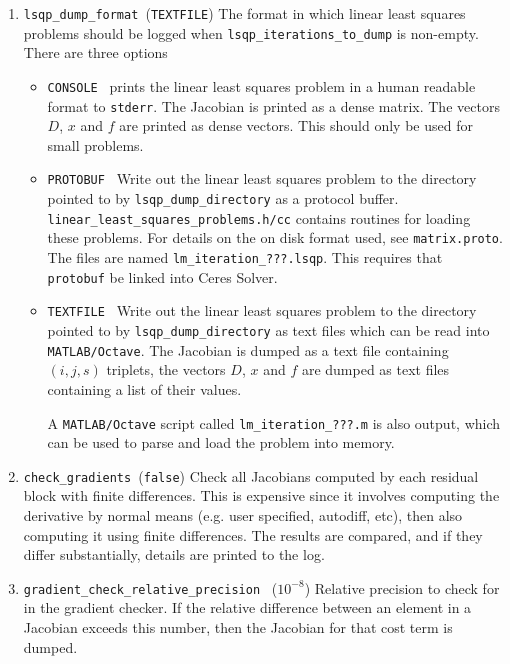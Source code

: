 \begin{enumerate}
\item{\texttt{lsqp\_dump\_format }}(\texttt{TEXTFILE}) The format in which linear least squares problems should be logged
when \texttt{lsqp\_iterations\_to\_dump} is non-empty.  There are three options
\begin{itemize}
\item{\texttt{CONSOLE }} prints the linear least squares problem in a human readable format
  to \texttt{stderr}. The Jacobian is printed as a dense matrix. The vectors
   $D$, $x$ and $f$ are printed as dense vectors. This should only be used
   for small problems.
\item{\texttt{PROTOBUF }}
   Write out the linear least squares problem to the directory
   pointed to by \texttt{lsqp\_dump\_directory} as a protocol
   buffer. \texttt{linear\_least\_squares\_problems.h/cc} contains routines for
   loading these problems. For details on the on disk format used,
   see \texttt{matrix.proto}. The files are named \texttt{lm\_iteration\_???.lsqp}. This requires that \texttt{protobuf} be linked into Ceres Solver.
\item{\texttt{TEXTFILE }}
   Write out the linear least squares problem to the directory
   pointed to by \texttt{lsqp\_dump\_directory} as text files
   which can be read into \texttt{MATLAB/Octave}. The Jacobian is dumped as a
   text file containing $(i,j,s)$ triplets, the vectors $D$, $x$ and $f$ are
   dumped as text files containing a list of their values.

   A \texttt{MATLAB/Octave} script called \texttt{lm\_iteration\_???.m} is also output,
   which can be used to parse and load the problem into memory.
\end{itemize}



\item{\texttt{check\_gradients }}(\texttt{false})
 Check all Jacobians computed by each residual block with finite
     differences. This is expensive since it involves computing the
     derivative by normal means (e.g. user specified, autodiff,
     etc), then also computing it using finite differences. The
     results are compared, and if they differ substantially, details
     are printed to the log.

\item{\texttt{gradient\_check\_relative\_precision }} ($10^{-8}$)
  Relative precision to check for in the gradient checker. If the
  relative difference between an element in a Jacobian exceeds
  this number, then the Jacobian for that cost term is dumped.


\end{enumerate}
